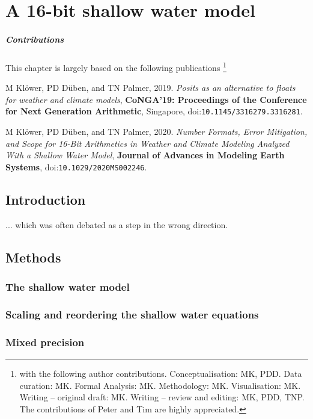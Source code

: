 \chapter{A 16-bit shallow water model}
\label{chap:shallow_water}

\paragraph{Contributions} This chapter is largely based on the following publications \footnote{with the following author contributions.
Conceptualisation: MK, PDD. Data curation: MK. Formal Analysis: MK. Methodology: MK. Visualisation: MK. Writing – original draft:
MK. Writing – review and editing: MK, PDD, TNP. The contributions of Peter and Tim are highly appreciated.}

\vspace{\baselineskip}
\indent M Klöwer, PD Düben, and TN Palmer, 2019. \emph{Posits as an alternative to floats for weather and climate models}, \textbf{CoNGA'19: Proceedings of the Conference for Next Generation Arithmetic}, Singapore, doi:\texttt{10.1145/3316279.3316281}.

\indent M Klöwer, PD Düben, and TN Palmer, 2020. \emph{Number Formats, Error Mitigation, and Scope for 16-Bit Arithmetics in Weather and Climate Modeling Analyzed With a Shallow Water Model}, \textbf{Journal of Advances in Modeling Earth Systems}, doi:\texttt{10.1029/2020MS002246}.
\vspace{\baselineskip}

\section{Introduction}

... which was often debated as a step in the wrong direction.

\section{Methods}
\subsection{The shallow water model}
\subsection{Scaling and reordering the shallow water equations}
\subsection{Mixed precision}
